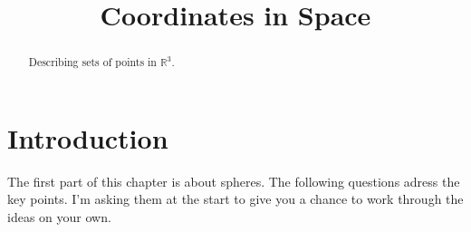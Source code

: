 \documentclass{ximera}
\title{Coordinates in Space}
\begin{document}
\begin{abstract}
Describing sets of points in $\mathbb{R}^3$.
\end{abstract}
\maketitle

 
 




\section*{Introduction}
The first part of this chapter is about spheres. The following questions adress the key points. I'm asking them at the start to give you a chance to work through the ideas on your own.
\end{document}
